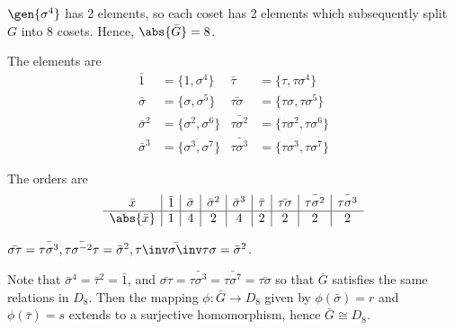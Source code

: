 \begin{solalph}
    \item $\gen{\sigma^4}$ has 2 elements, so each coset has 2 elements which subsequently split $G$ into 8 cosets. Hence, $\abs{\bar G} = 8$.
    \item The elements are
    \begin{align*}
        \bar 1 & = \{1, \sigma^4\} & \bar\tau & = \{\tau, \tau\sigma^4\} \\
        \bar\sigma & = \{\sigma, \sigma^5\} & \bar{\tau\sigma} & = \{\tau\sigma, \tau\sigma^5\} \\
        \bar\sigma^2 & = \{\sigma^2, \sigma^6\} & \bar{\tau\sigma^2} & = \{\tau\sigma^2, \tau\sigma^6\} \\
        \bar\sigma^3 & = \{\sigma^3, \sigma^7\} & \bar{\tau\sigma^3} & = \{\tau\sigma^3, \tau\sigma^7\}
    \end{align*}
    \item The orders are
    \[
    \begin{array}{c|c|c|c|c|c|c|c|c}
        \bar x & \bar 1 & \bar\sigma & \bar\sigma^2 & \bar\sigma^3 & \bar\tau & \bar{\tau\sigma} & \bar{\tau\sigma^2} & \bar{\tau\sigma^3} \\
        \hline
        \abs{\bar x} & 1 & 4 & 2 & 4 & 2 & 2 & 2 & 2
    \end{array}
    \]
    \item $\bar{\sigma\tau} = \bar{\tau\sigma^3}, \bar{\tau\sigma^{-2}\tau} = \bar\sigma^2, \bar{\tau\inv\sigma\inv\tau\sigma} = \bar\sigma^2$.
    \item Note that $\bar\sigma^4 = \bar\tau^2 = \bar 1$, and $\bar{\sigma\tau} = \bar{\tau\sigma^3} = \bar{\tau\sigma^7} = \bar{\tau\sigma}$ so that $\bar G$ satisfies the same relations in $D_8$. Then the mapping $\phi : \bar G \to D_8$ given by $\phi(\bar\sigma) = r$ and $\phi(\bar\tau) = s$ extends to a surjective homomorphism, hence $\bar G \cong D_8$.
\end{solalph}

\newpage


